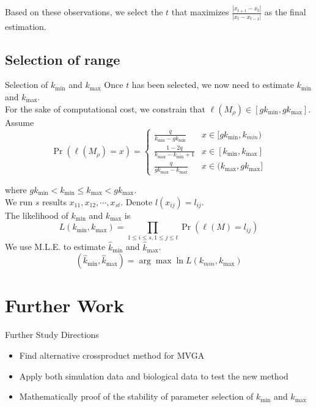\documentclass[xcolor=dvipsnames]{beamer}
\begin{document}
\begin{frame}
Based on these observations, we select the $t$ that maximizes $\frac{|x_{t+1}-x_t|}{|x_t-x_{t-1}|}$ as the final estimation.\\
\end{frame}
\subsection{Selection of range}
\begin{frame}{Selection of $k_{\min}$ and $k_{\max}$}
Once $t$ has been selected, we now need to estimate $k_{\min}$ and $k_{\max}$.\\
For the sake of computational cost, we constrain that $\ell(M_{\rho})\in[gk_{\min},gk_{\max}]$.\\
Assume
\begin{displaymath}
\Pr(\ell(M_{\rho})=x)=
\begin{cases}
\frac{q}{k_{\min}-gk_{\min}}&x\in[gk_{\min},k_{min})\\
\frac{1-2q}{k_{\max}-k_{\min}+1}&x\in[k_{\min},k_{\max}]\\
\frac{q}{gk_{\max}-k_{\max}}&x\in(k_{\max},gk_{\max}]
\end{cases}
\end{displaymath}
\end{frame}
\begin{frame}
where $gk_{\min}<k_{\min}\leqslant k_{\max}<gk_{\max}$.\\
We run $s$ results $x_{11},x_{12},\cdots,x_{st}$. Denote $l(x_{ij})=l_{ij}$.\\
The likelihood of $k_{\min}$ and $k_{\max}$ is
\[
L(k_{\min},k_{\max})=\prod_{1\leqslant i\leqslant s, 1\leqslant j\leqslant t}\Pr(\ell(M)=l_{ij})
\]
We use M.L.E. to estimate $\hat{k}_{\min}$ and $\hat{k}_{\max}$.
\[
(\hat{k}_{\min},\hat{k}_{\max})=\arg \max \ln L(k_{min},k_{\max})
\]
\end{frame}
\section{Further Work}
\begin{frame}{Further Study Directions}
\begin{itemize}
\item Find alternative crossproduct method for MVGA\\
\item Apply both simulation data and biological data to test the new method\\
\item Mathematically proof of the stability of parameter selection of $k_{\min}$ and $k_{\max}$\\
\end{itemize}
\end{frame}
\end{document}
